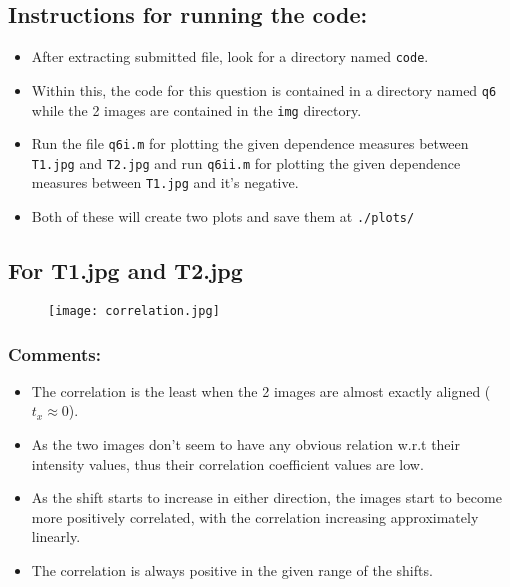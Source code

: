 \documentclass[11pt, fleqn]{article}
\begin{document}
\subsection*{Instructions for running the code:}
\begin{itemize}
    \item After extracting submitted file, look for a directory named \texttt{code}. 
    \item Within this, the code for this question is contained in a directory named \texttt{q6} while the 2 images are contained in the \texttt{img} directory.
    \item Run the file \texttt{q6i.m} for plotting the given dependence measures between \texttt{T1.jpg} and \texttt{T2.jpg} and run \texttt{q6ii.m} for plotting the given dependence measures between \texttt{T1.jpg} and it's negative. 
    \item Both of these will create two plots and save them at \texttt{./plots/}
\end{itemize}
\vspace{-1em}
\subsection*{\Large For T1.jpg and T2.jpg}

\begin{figure}[H]
    \centering
    \texttt{[image: correlation.jpg]}
    \label{q6ic}
\end{figure}

\subsubsection*{Comments:}
\begin{itemize}
    \item The correlation is the least when the 2 images are almost exactly aligned ($t_x \approx 0$).
    \item As the two images don't seem to have any obvious relation w.r.t their intensity values, thus their correlation coefficient values are low.
    \item As the shift starts to increase in either direction, the images start to become more positively correlated, with the correlation increasing approximately linearly.
    \item The correlation is always positive in the given range of the shifts.
\end{itemize}
\end{document}
